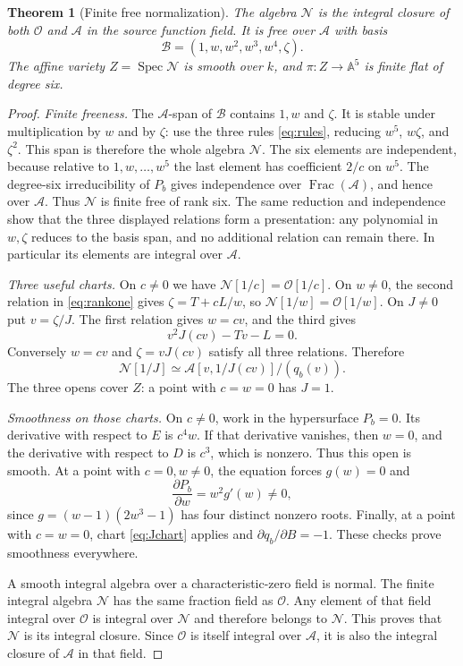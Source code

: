\documentclass[11pt,a4paper]{article}
\newtheorem{theorem}{Theorem}[section]
\theoremstyle{definition}
\newcommand{\A}{\mathbb A}
\newcommand{\Spec}{\operatorname{Spec}}
\newcommand{\base}{\mathcal A}
\newcommand{\normal}{\mathcal N}
\newcommand{\ord}{\mathcal O}
\begin{document}
\begin{theorem}[Finite free normalization]\label{thm:normalization}
The algebra $\normal$ is the integral closure of both $\ord$ and $\base$
in the source function field. It is free over $\base$ with basis
\[
 \mathcal B=(1,w,w^2,w^3,w^4,\zeta).
\]
The affine variety $Z=\Spec\normal$ is smooth over $k$, and
$\pi:Z\to\A^5$ is finite flat of degree six.
\end{theorem}
\begin{proof}
\emph{Finite freeness.} The $\base$-span of $\mathcal B$ contains $1,w$
and $\zeta$. It is stable under multiplication by $w$ and by $\zeta$:
use the three rules \eqref{eq:rules}, reducing $w^5$, $w\zeta$, and
$\zeta^2$. This span is therefore the whole algebra $\normal$.
The six elements are independent, because relative to
$1,w,\ldots,w^5$ the last element has coefficient $2/c$ on $w^5$.
The degree-six irreducibility of $P_b$ gives independence over
$\operatorname{Frac}(\base)$, and hence over $\base$.
Thus $\normal$ is finite free of rank six. The same reduction and
independence show that the three displayed relations form a presentation:
any polynomial in $w,\zeta$ reduces to the basis span, and no additional
relation can remain there. In particular its elements are integral over
$\base$.

\emph{Three useful charts.} On $c\ne0$ we have
$\normal[1/c]=\ord[1/c]$. On $w\ne0$, the second relation in
\eqref{eq:rankone} gives $\zeta=T+cL/w$, so
$\normal[1/w]=\ord[1/w]$. On $J\ne0$ put $v=\zeta/J$. The first
relation gives $w=cv$, and the third gives
\[
 v^2J(cv)-Tv-L=0.
\]
Conversely $w=cv$ and $\zeta=vJ(cv)$ satisfy all three relations. Therefore
\begin{equation}\label{eq:Jchart}
 \normal[1/J]\simeq
 \base[v,1/J(cv)]/(q_b(v)).
\end{equation}
The three opens cover $Z$: a point with $c=w=0$ has $J=1$.

\emph{Smoothness on those charts.} On $c\ne0$, work in the hypersurface
$P_b=0$. Its derivative with respect to $E$ is $c^4w$. If that derivative
vanishes, then $w=0$, and the derivative with respect to $D$ is $c^3$,
which is nonzero. Thus this open is smooth. At a point with $c=0,w\ne0$,
the equation forces $g(w)=0$ and
\[
 \frac{\partial P_b}{\partial w}=w^2g'(w)\ne0,
\]
since $g=(w-1)(2w^3-1)$ has four distinct nonzero roots.
Finally, at a point with $c=w=0$, chart \eqref{eq:Jchart} applies and
$\partial q_b/\partial B=-1$. These checks prove smoothness everywhere.

A smooth integral algebra over a characteristic-zero field is normal.
The finite integral algebra $\normal$ has the same fraction field as
$\ord$. Any element of that field integral over $\ord$ is integral over
$\normal$ and therefore belongs to $\normal$. This proves that
$\normal$ is its integral closure. Since $\ord$ is itself integral over
$\base$, it is also the integral closure of $\base$ in that field.
\end{proof}
\end{document}

